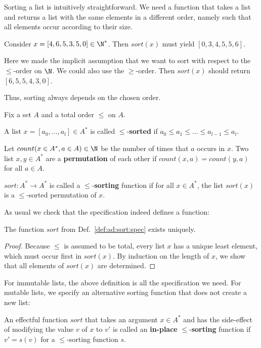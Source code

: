 Sorting a list is intuitively straightforward.
We need a function that takes a list and returns a list with the same elements in a different order, namely such that all elements occur according to their size.

\begin{example}
Consider $x=[4,6,5,3,5,0]\in\N^*$.
Then $sort(x)$ must yield $[0,3,4,5,5,6]$.

Here we made the implicit assumption that we want to sort with respect to the $\leq$-order on $\N$.
We could also use the $\geq$-order.
Then $sort(x)$ should return $[6,5,5,4,3,0]$.

Thus, sorting always depends on the chosen order.
\end{example}

\begin{definition}[Sorting]\label{def:ad:sort:spec}
Fix a set $A$ and a total order $\leq$ on $A$.

A list $x=[a_0,\ldots,a_l]\in A^*$ is called $\leq$-\textbf{sorted} if $a_0\leq a_1 \leq \ldots \leq a_{l-1}\leq a_l$.

Let $count(x\in A^*,a\in A)\in\N$ be the number of times that $a$ occurs in $x$.
Two list $x,y\in A^*$ are a \textbf{permutation} of each other if $count(x,a)=count(y,a)$ for all $a\in A$.

$sort:A^*\to A^*$ is called a $\leq$-\textbf{sorting} function if for all $x\in A^*$, the list $sort(x)$ is a $\leq$-sorted permutation of $x$.
\end{definition}

As usual we check that the specification indeed defines a function:

\begin{theorem}[Uniqueness]
The function $sort$ from Def.~\ref{def:ad:sort:spec} exists uniquely.
\end{theorem}
\begin{proof}
Because $\leq$ is assumed to be total, every list $x$ has a unique least element, which must occur first in $sort(x)$.
By induction on the length of $x$, we show that all elements of $sort(x)$ are determined.
\end{proof}

For immutable lists, the above definition is all the specification we need.
For mutable lists, we specify an alternative sorting function that does not create a new list:

\begin{definition}
An effectful function $sort$ that takes an argument $x\in A^*$ and has the side-effect of modifying the value $v$ of $x$ to $v'$ is called an \textbf{in-place} $\leq$-\textbf{sorting} function if $v'=s(v)$ for a $\leq$-sorting function $s$.
\end{definition}

